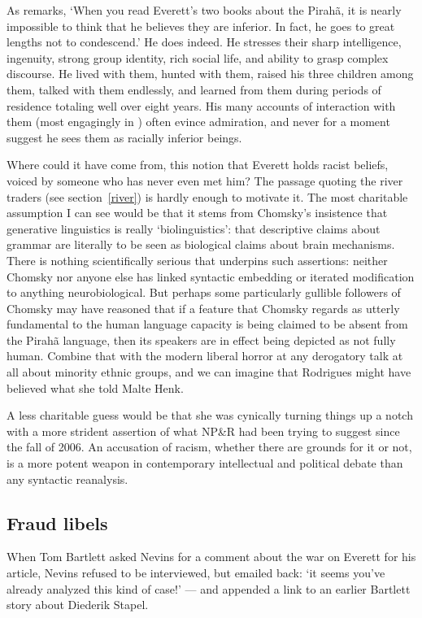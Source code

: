 \documentclass[output=paper,colorlinks,citecolor=brown
]{langscibook}
\begin{document}
As \citet{Bartlett12} remarks, `When you read Everett’s two books about
the Pirah{\~a}, it is nearly impossible to think that he believes they
are inferior. In fact, he goes to great lengths not to condescend.'
He does indeed.  He stresses their sharp intelligence, ingenuity, strong
group identity, rich social life, and ability to grasp complex discourse.
He lived with them, hunted with them, raised his three children among
them, talked with them endlessly, and learned from them during periods
of residence totaling well over eight years. His many accounts of
interaction with them (most engagingly in \citealt{Everett08}) often
evince admiration, and never for a moment suggest he sees them as
racially inferior beings.

Where could it have come from, this notion that Everett holds racist
beliefs, voiced by someone who has never even met him? The passage
quoting the river traders (see section~\ref{river}) is hardly
enough to motivate it. The most charitable assumption I can see
would be that it stems from Chomsky's insistence that generative
linguistics is really `biolinguistics': that descriptive claims about
grammar are literally to be seen as biological claims about brain
mechanisms. There is nothing scientifically serious that underpins
such assertions: neither Chomsky nor anyone else has linked syntactic
embedding or iterated modification to anything neurobiological. But
perhaps some particularly gullible followers of Chomsky may have
reasoned that if a feature that Chomsky regards as utterly fundamental
to the human language capacity is being claimed to be absent from the
Pirah{\~a} language, then its speakers are in effect being depicted as
not fully human. Combine that with the modern liberal horror at any
derogatory talk at all about minority ethnic groups, and we can
imagine that Rodrigues might have believed what she told Malte Henk.

A less charitable guess would be that she was cynically turning things
up a notch with a more strident assertion of what NP\&R had been trying
to suggest since the fall of 2006. An accusation of racism, whether
there are grounds for it or not, is a more potent weapon in contemporary
intellectual and political debate than any syntactic reanalysis.

\subsection{Fraud libels}

When Tom Bartlett asked Nevins for a comment about the war on Everett
for his \citeyear{Bartlett12} article, Nevins refused to be interviewed,
but emailed back: `it seems you've already analyzed this kind of case!'
--- and appended a link to an earlier Bartlett story about Diederik
Stapel.
\end{document}
